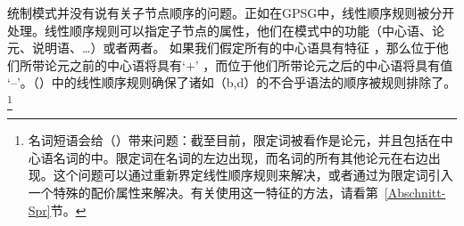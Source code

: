 统制模式并没有说\indexgpsg 有关子节点顺序的问题。正如在GPSG中，线性顺序规则被分开处理。线性顺序规则可以指定子节点的属性，他们在模式中的功能（中心语、论元、说明语、\ldots）或者两者。
如果我们假定所有的中心语具有特征\initial{} ，那么位于他们所带论元之前的中心语将具有\initialv `$+$' ，而位于他们所带论元之后的中心语将具有值 `--'。（）中的线性顺序规则确保了诸如（b,d）的不合乎语法的顺序被规则排除了。\footnote{
名词短语会给（）带来问题：截至目前，限定词被看作是论元，并且包括在中心语名词的\subcatl 中。限定词在名词的左边出现，而名词的所有其他论元在右边出现。这个问题可以通过重新界定线性顺序规则\citep[--165]{Mueller99a}来解决，或者通过为限定词引入一个特殊的配价属性来解决\citep[Section~9.4]{ps2}。有关使用这一特征的方法，请看第~\ref{Abschnitt-Spr}节。
}

